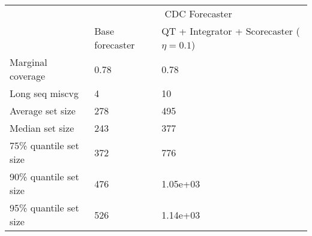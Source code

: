 \begin{tabular}{lll}
\toprule
& \multicolumn{2}{c}{CDC Forecaster} \\
& Base forecaster & QT + Integrator + Scorecaster ($\eta=0.1$) \\
\midrule
Marginal coverage & 0.78 & 0.78 \\
Long seq miscvg & 4 & 10 \\
Average set size & 278 & 495 \\
Median set size & 243 & 377 \\
75\% quantile set size & 372 & 776 \\
90\% quantile set size & 476 & 1.05e+03 \\
95\% quantile set size & 526 & 1.14e+03 \\
\bottomrule
\end{tabular}
